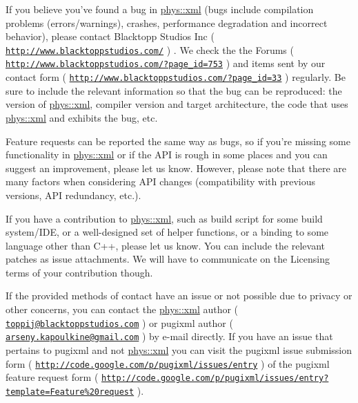 If you believe you've found a bug in \hyperlink{namespacephys_1_1xml}{phys::xml} (bugs include compilation problems (errors/warnings), crashes, performance degradation and incorrect behavior), please contact Blacktopp Studios Inc ( \href{http://www.blacktoppstudios.com/}{\tt http://www.blacktoppstudios.com/} ) . We check the the Forums ( \href{http://www.blacktoppstudios.com/?page_id=753}{\tt http://www.blacktoppstudios.com/?page\_\-id=753} ) and items sent by our contact form ( \href{http://www.blacktoppstudios.com/?page_id=33}{\tt http://www.blacktoppstudios.com/?page\_\-id=33} ) regularly. Be sure to include the relevant information so that the bug can be reproduced: the version of \hyperlink{namespacephys_1_1xml}{phys::xml}, compiler version and target architecture, the code that uses \hyperlink{namespacephys_1_1xml}{phys::xml} and exhibits the bug, etc. \par
 \par
 Feature requests can be reported the same way as bugs, so if you're missing some functionality in \hyperlink{namespacephys_1_1xml}{phys::xml} or if the API is rough in some places and you can suggest an improvement, please let us know. However, please note that there are many factors when considering API changes (compatibility with previous versions, API redundancy, etc.). \par
 \par
 If you have a contribution to \hyperlink{namespacephys_1_1xml}{phys::xml}, such as build script for some build system/IDE, or a well-\/designed set of helper functions, or a binding to some language other than C++, please let us know. You can include the relevant patches as issue attachments. We will have to communicate on the Licensing terms of your contribution though. \par
 \par
 If the provided methods of contact have an issue or not possible due to privacy or other concerns, you can contact the \hyperlink{namespacephys_1_1xml}{phys::xml} author ( \href{mailto:toppij@blacktoppstudios.com}{\tt toppij@blacktoppstudios.com} ) or pugixml author ( \href{mailto:arseny.kapoulkine@gmail.com}{\tt arseny.kapoulkine@gmail.com} ) by e-\/mail directly. If you have an issue that pertains to pugixml and not \hyperlink{namespacephys_1_1xml}{phys::xml} you can visit the pugixml issue submission form ( \href{http://code.google.com/p/pugixml/issues/entry}{\tt http://code.google.com/p/pugixml/issues/entry} ) of the pugixml feature request form ( \href{http://code.google.com/p/pugixml/issues/entry?template=Feature%20request}{\tt http://code.google.com/p/pugixml/issues/entry?template=Feature\%20request} ). \par
